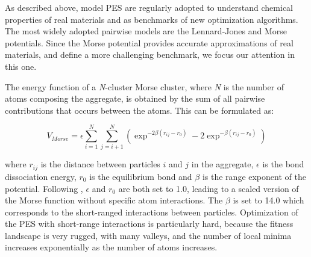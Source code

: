 	As described above, model PES are regularly adopted to understand chemical properties of real materials and as benchmarks of new optimization algorithms. The most widely adopted pairwise models are the Lennard-Jones and Morse potentials. Since the Morse potential provides accurate approximations of real materials, and define a more challenging benchmark, we focus our attention in this one.

	The energy function of a \emph{N}-cluster Morse cluster, where \emph{N} is the number of atoms composing the aggregate, is obtained by the sum of all pairwise contributions that occurs between the atoms. This can be formulated as:
	
	\begin{equation} 
		\label{eq:morse_potential}
		V_{Morse} = \epsilon \sum_{i=1}^{N}\sum_{j=i+1}^{N} \left ( \exp^{-2\beta(r_{ij}-r_{0})} - 2\exp^{-\beta(r_{ij}-r_{0})} \right)
	\end{equation}


	\noindent where $r_{ij}$ is the distance between particles $i$ and $j$ in the aggregate, $\epsilon$ is the bond dissociation energy, $r_{0}$ is the equilibrium bond and $\beta$ is the range exponent of the potential. Following \cite{doye97}, $\epsilon$ and $r_{0}$ are both set to 1.0, leading to a scaled version of the Morse function without specific atom interactions. The $\beta$ is set to 14.0 which corresponds to the short-ranged interactions between particles. Optimization of the PES with short-range interactions is particularly hard, because the fitness landscape is very rugged, with many valleys, and the number of local minima increases exponentially as the number of atoms increases.
	
	
	
	
